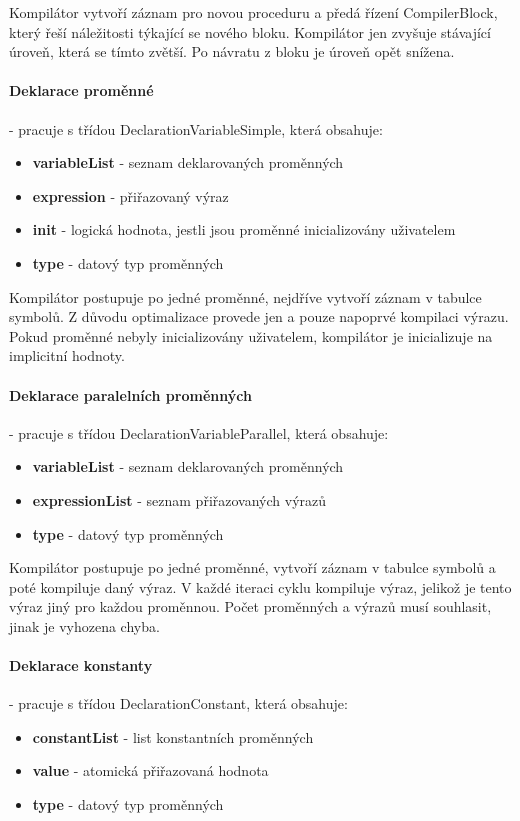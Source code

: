 \documentclass[
12pt,
a4paper,
pdftex,
czech,
titlepage
]{report}
\begin{document}
Kompilátor vytvoří záznam pro novou proceduru a předá řízení CompilerBlock, který řeší náležitosti týkající se nového bloku. Kompilátor jen zvyšuje stávající úroveň, která se tímto zvětší. Po návratu z bloku je úroveň opět snížena.

\paragraph{Deklarace proměnné} - pracuje s třídou DeclarationVariableSimple, která obsahuje:
\begin{itemize}
\item \textbf{variableList} - seznam deklarovaných proměnných
\item \textbf{expression} - přiřazovaný výraz
\item \textbf{init} - logická hodnota, jestli jsou proměnné inicializovány uživatelem
\item \textbf{type} - datový typ proměnných
\end{itemize} 

Kompilátor postupuje po jedné proměnné, nejdříve vytvoří záznam v tabulce symbolů. Z důvodu optimalizace provede jen a pouze napoprvé kompilaci výrazu. Pokud proměnné nebyly inicializovány uživatelem, kompilátor je inicializuje na implicitní hodnoty.

\paragraph{Deklarace paralelních proměnných} - pracuje s třídou DeclarationVariableParallel, která obsahuje:
\begin{itemize}
\item \textbf{variableList} - seznam deklarovaných proměnných
\item \textbf{expressionList} - seznam přiřazovaných výrazů
\item \textbf{type} - datový typ proměnných
\end{itemize}

Kompilátor postupuje po jedné proměnné, vytvoří záznam v tabulce symbolů a poté kompiluje daný výraz. V každé iteraci cyklu kompiluje výraz, jelikož je tento výraz jiný pro každou proměnnou. Počet proměnných a výrazů musí souhlasit, jinak je vyhozena chyba.

\paragraph{Deklarace konstanty} - pracuje s třídou DeclarationConstant, která obsahuje:
\begin{itemize}
\item \textbf{constantList} - list konstantních proměnných
\item \textbf{value} - atomická přiřazovaná hodnota
\item \textbf{type} - datový typ proměnných
\end{itemize}
\end{document}
